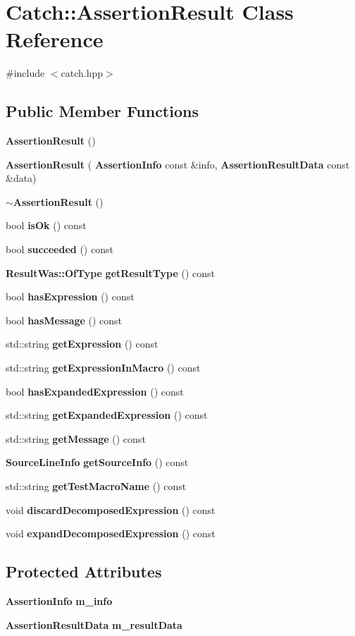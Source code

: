 \section{Catch\+:\+:Assertion\+Result Class Reference}
\label{class_catch_1_1_assertion_result}


{\ttfamily \#include $<$catch.\+hpp$>$}

\subsection*{Public Member Functions}
\begin{DoxyCompactItemize}
\item 
\textbf{ Assertion\+Result} ()
\item 
\textbf{ Assertion\+Result} (\textbf{ Assertion\+Info} const \&info, \textbf{ Assertion\+Result\+Data} const \&data)
\item 
\textbf{ $\sim$\+Assertion\+Result} ()
\item 
bool \textbf{ is\+Ok} () const
\item 
bool \textbf{ succeeded} () const
\item 
\textbf{ Result\+Was\+::\+Of\+Type} \textbf{ get\+Result\+Type} () const
\item 
bool \textbf{ has\+Expression} () const
\item 
bool \textbf{ has\+Message} () const
\item 
std\+::string \textbf{ get\+Expression} () const
\item 
std\+::string \textbf{ get\+Expression\+In\+Macro} () const
\item 
bool \textbf{ has\+Expanded\+Expression} () const
\item 
std\+::string \textbf{ get\+Expanded\+Expression} () const
\item 
std\+::string \textbf{ get\+Message} () const
\item 
\textbf{ Source\+Line\+Info} \textbf{ get\+Source\+Info} () const
\item 
std\+::string \textbf{ get\+Test\+Macro\+Name} () const
\item 
void \textbf{ discard\+Decomposed\+Expression} () const
\item 
void \textbf{ expand\+Decomposed\+Expression} () const
\end{DoxyCompactItemize}
\subsection*{Protected Attributes}
\begin{DoxyCompactItemize}
\item 
\textbf{ Assertion\+Info} \textbf{ m\+\_\+info}
\item 
\textbf{ Assertion\+Result\+Data} \textbf{ m\+\_\+result\+Data}
\end{DoxyCompactItemize}



